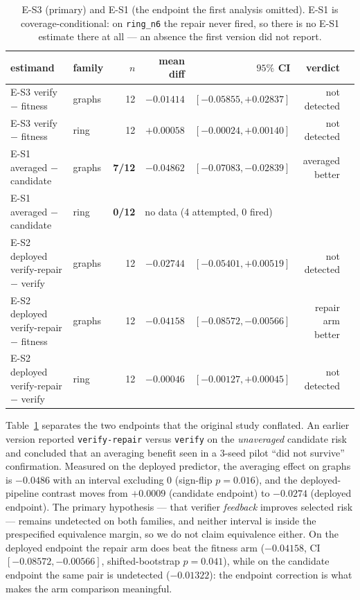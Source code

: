 \documentclass[11pt]{article}
\begin{document}
\begin{table}[t]
\centering
\caption{E-S3 (primary) and E-S1 (the endpoint the first analysis omitted). E-S1 is
coverage-conditional: on \texttt{ring\_n6} the repair never fired, so there is no E-S1
estimate there at all --- an absence the first version did not report.}
\label{tab:search}
\small
\begin{tabular}{@{}llrrrrl@{}}
\toprule
estimand & family & $n$ & mean diff & $95\%$ CI & verdict \\
\midrule
E-S3 verify $-$ fitness & graphs & 12 & $-0.01414$ & $[-0.05855,+0.02837]$ & not detected \\
E-S3 verify $-$ fitness & ring   & 12 & $+0.00058$ & $[-0.00024,+0.00140]$ & not detected \\
\midrule
E-S1 averaged $-$ candidate & graphs & \textbf{7/12} & $\mathbf{-0.04862}$ & $[-0.07083,-0.02839]$ & averaged better \\
E-S1 averaged $-$ candidate & ring & \textbf{0/12} & \multicolumn{3}{l}{no data (4 attempted, 0 fired)} \\
\midrule
E-S2 deployed verify-repair $-$ verify & graphs & 12 & $-0.02744$ & $[-0.05401,+0.00519]$ & not detected \\
E-S2 deployed verify-repair $-$ fitness & graphs & 12 & $-0.04158$ & $[-0.08572,-0.00566]$ & repair arm better \\
E-S2 deployed verify-repair $-$ verify & ring   & 12 & $-0.00046$ & $[-0.00127,+0.00045]$ & not detected \\
\bottomrule
\end{tabular}
\end{table}

Table~\ref{tab:search} separates the two endpoints that the original study conflated. An
earlier version reported
\texttt{verify-repair} versus \texttt{verify} on the \emph{unaveraged} candidate risk and
concluded that an averaging benefit seen in a $3$-seed pilot ``did not survive''
confirmation. Measured on the deployed predictor, the averaging effect on graphs is
$-0.0486$ with an interval excluding $0$ (sign-flip $p{=}0.016$), and the deployed-pipeline
contrast moves from $+0.0009$ (candidate endpoint) to $-0.0274$ (deployed endpoint). The
primary hypothesis --- that verifier \emph{feedback} improves selected risk --- remains
undetected on both families, and neither interval is inside the prespecified equivalence
margin, so we do not claim equivalence either. On the deployed endpoint the repair arm does
beat the fitness arm ($-0.04158$, CI $[-0.08572,-0.00566]$, shifted-bootstrap $p{=}0.041$),
while on the candidate endpoint the same pair is undetected ($-0.01322$): the endpoint
correction is what makes the arm comparison meaningful.
\end{document}
